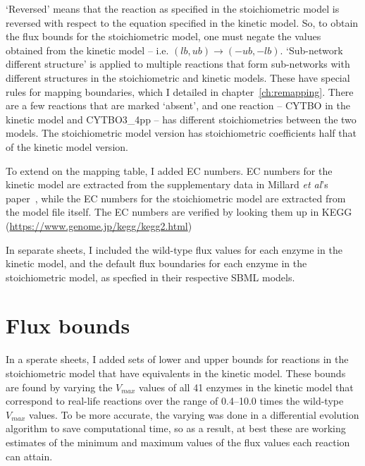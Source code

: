 \documentclass[parskip=full]{scrreprt}
\begin{document}
`Reversed' means that the reaction as specified in the stoichiometric model is reversed with respect to the equation specified in the kinetic model. So, to obtain the flux bounds for the stoichiometric model, one must negate the values obtained from the kinetic model -- i.e. $(lb, ub) \rightarrow (-ub, -lb)$. `Sub-network different structure' is applied to multiple reactions that form sub-networks with different structures in the stoichiometric and kinetic models. These have special rules for mapping boundaries, which I detailed in chapter~\vref{ch:remapping}. There are a few reactions that are marked `absent', and one reaction -- CYTBO in the kinetic model and CYTBO3\_4pp -- has different stoichiometries between the two models. The stoichiometric model version has stoichiometric coefficients half that of the kinetic model version.

To extend on the mapping table, I added EC numbers. EC numbers for the kinetic model are extracted from the supplementary data in Millard \emph{et al}'s paper~\cite{millard_metabolic_2017}, while the EC numbers for the stoichiometric model are extracted from the model file itself. The EC numbers are verified by looking them up in KEGG (\url{https://www.genome.jp/kegg/kegg2.html})

In separate sheets, I included the wild-type flux values for each enzyme in the kinetic model, and the default flux boundaries for each enzyme in the stoichiometric model, as specfied in their respective SBML models.

\chapter{Flux bounds}
\label{ch:fluxbounds}

In a sperate sheets, I added sets of lower and upper bounds for reactions in the stoichiometric model that have equivalents in the kinetic model. These bounds are found by varying the $V_{max}$ values of all 41 enzymes in the kinetic model that correspond to real-life reactions over the range of 0.4--10.0 times the wild-type $V_{max}$ values. To be more accurate, the varying was done in a differential evolution algorithm to save computational time, so as a result, at best these are working estimates of the minimum and maximum values of the flux values each reaction can attain.




\end{document}
